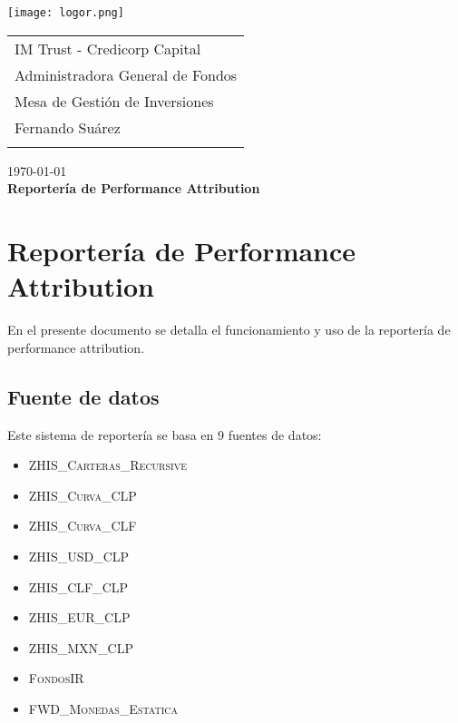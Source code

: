 \documentclass{article}
\begin{document}
\texttt{[image: logor.png]}
\vspace*{-1.55cm}

\hspace*{1.4 cm}
 \hspace*{2.9 cm}
 {\footnotesize
 \begin{tabular}{l}
  \sc IM Trust - Credicorp Capital\\
  \sc Administradora General de Fondos \\
  \sc Mesa de Gestión de Inversiones  \\
  \sc Fernando Suárez  \\
  \vspace{15\baselineskip}\mbox{}
  \vspace{-3mm}\mbox{}
 \end{tabular}
}

 \bigskip

\vspace*{5mm}
\begin{center}
{\today} \\
\vspace{3mm}
{\Large\bf Reportería de Performance Attribution} \\
\vspace{2mm}
\end{center}
\section{Reportería de Performance Attribution}


En el presente documento se detalla el funcionamiento y uso de la reportería de performance attribution. 
\subsection{Fuente de datos}

Este sistema de reportería se basa en 9 fuentes de datos:
\begin{itemize}
\item \textsc{ZHIS\_Carteras\_Recursive}
\item \textsc{ZHIS\_Curva\_CLP}
\item \textsc{ZHIS\_Curva\_CLF}
\item \textsc{ZHIS\_USD\_CLP}
\item \textsc{ZHIS\_CLF\_CLP}
\item \textsc{ZHIS\_EUR\_CLP}
\item \textsc{ZHIS\_MXN\_CLP}
\item \textsc{FondosIR}
\item \textsc{FWD\_Monedas\_Estatica}
\end{itemize}
\end{document}
